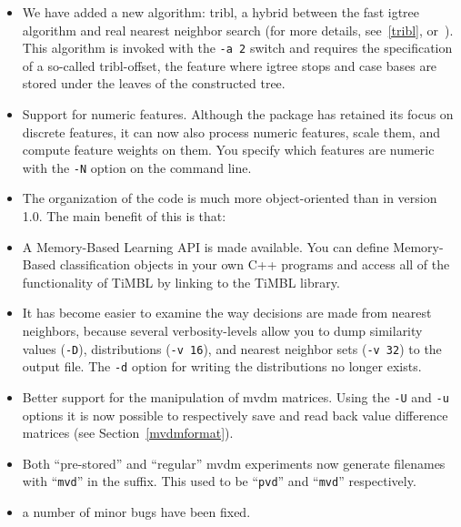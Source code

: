 \documentclass{report}
\begin{document}
\begin{itemize}

\item We have added a new algorithm: {\sc tribl}, a hybrid between
the fast {\sc igtree} algorithm and real nearest neighbor search (for
more details, see~\ref{tribl}, or~). This
algorithm is invoked with the {\tt -a 2} switch and requires the
specification of a so-called {\sc tribl}-offset, the feature where
{\sc igtree} stops and case bases are stored under the leaves of the
constructed tree.

\item Support for numeric features. Although the package has retained
its focus on discrete features, it can now also process numeric
features, scale them, and compute feature weights on them. You
specify which features are numeric with the {\tt -N} option on the
command line.

\item The organization of the code is much more object-oriented than
in version 1.0. The main benefit of this is that:

\item A Memory-Based Learning API is made available. You can define
Memory-Based classification objects in your own C++ programs and
access all of the functionality of TiMBL by linking to the TiMBL
library.

\item It has become easier to examine the way decisions are made from
nearest neighbors, because several verbosity-levels allow you to dump
similarity values ({\tt -D}), distributions ({\tt -v 16}), and nearest
neighbor sets ({\tt -v 32}) to the output file. The {\tt -d} option
for writing the distributions no longer exists.

\item Better support for the manipulation of {\sc mvdm}
matrices. Using the {\tt -U} and {\tt -u} options it is now possible
to respectively save and read back value difference matrices (see
Section~\ref{mvdmformat}).

\item Both ``pre-stored'' and ``regular'' {\sc mvdm} experiments now
generate filenames with ``{\tt mvd}'' in the suffix. This used to be
``{\tt pvd}'' and ``{\tt mvd}'' respectively.

\item a number of minor bugs have been fixed.

\end{itemize}
\end{document}
